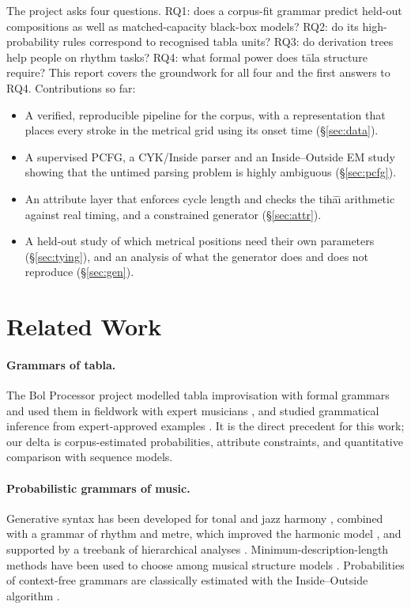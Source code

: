 \documentclass[11pt]{article}
\newcommand{\tala}{t\=ala}
\newcommand{\tihai}{tih\=a\={\i}}
\begin{document}
The project asks four questions. RQ1: does a corpus-fit grammar predict
held-out compositions as well as matched-capacity black-box models? RQ2: do
its high-probability rules correspond to recognised tabla units? RQ3: do
derivation trees help people on rhythm tasks? RQ4: what formal power does
\tala{} structure require? This report covers the groundwork for all four and
the first answers to RQ4. Contributions so far:

\begin{itemize}
\setlength\itemsep{0pt}
\item A verified, reproducible pipeline for the corpus, with a representation
  that places every stroke in the metrical grid using its onset time (\S\ref{sec:data}).
\item A supervised PCFG, a CYK/Inside parser and an Inside--Outside EM study
  showing that the untimed parsing problem is highly ambiguous (\S\ref{sec:pcfg}).
\item An attribute layer \citep{knuth1968semantics} that enforces cycle length
  and checks the \tihai{} arithmetic against real timing, and a constrained
  generator (\S\ref{sec:attr}).
\item A held-out study of which metrical positions need their own parameters
  (\S\ref{sec:tying}), and an analysis of what the generator does and does
  not reproduce (\S\ref{sec:gen}).
\end{itemize}

\section{Related Work}

\paragraph{Grammars of tabla.} The Bol Processor project modelled tabla
improvisation with formal grammars and used them in fieldwork with expert
musicians \citep{kippen1992modelling}, and studied grammatical inference from
expert-approved examples \citep{kippen1989identification}. It is the direct
precedent for this work; our delta is corpus-estimated probabilities,
attribute constraints, and quantitative comparison with sequence models.

\paragraph{Probabilistic grammars of music.} Generative syntax has been
developed for tonal and jazz harmony \citep{rohrmeier2011towards}, combined
with a grammar of rhythm and metre, which improved the harmonic model
\citep{harasim2019harmonic}, and supported by a treebank of hierarchical
analyses \citep{harasim2020jazz}. Minimum-description-length methods have been
used to choose among musical structure models \citep{mavromatis2009minimum}.
Probabilities of context-free grammars are classically estimated with the
Inside--Outside algorithm \citep{lari1990estimation}.
\end{document}
